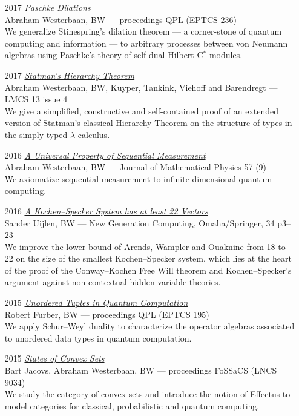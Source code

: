 \documentclass{article}
\newcommand\partitle[1]{\vskip20pt\par\noindent{\textsf{\textbf{#1}}}}
\begin{document}
\partitle{Selected publications}
\begin{itemize}
    \item[2017] \emph{\href{http://eptcs.web.cse.unsw.edu.au/paper.cgi?QPL2016.15}{Paschke Dilations}}\\
    {\footnotesize Abraham Westerbaan, BW --- proceedings QPL (EPTCS 236)}\\
    We generalize Stinespring's dilation theorem --- a corner-stone
        of quantum computing and information --- to arbitrary processes
        between von Neumann algebras using Paschke's theory of
        self-dual Hilbert C$^*$-modules.
    \item[2017] \emph{\href{https://lmcs.episciences.org/4089}{Statman's Hierarchy Theorem}}\\
    {\footnotesize Abraham Westerbaan, BW,  Kuyper, Tankink, Viehoff and Barendregt --- LMCS 13 issue 4}\\
    We give a simplified, constructive and self-contained proof
        of an extended version of Statman's classical Hierarchy Theorem
        on the structure of types in the simply typed $\lambda$-calculus.
    \item[2016] \emph{\href{http://scitation.aip.org/content/aip/journal/jmp/57/9/10.1063/1.4961526}{A Universal Property of Sequential Measurement}}\\
    {\footnotesize Abraham Westerbaan, BW ---
    Journal of Mathematical Physics 57 (9)}\\
    We axiomatize sequential measurement to infinite dimensional quantum
    computing.
\item[2016] \emph{\href{https://link.springer.com/article/10.1007/s00354-016-0202-5}{A Kochen--Specker System has at least 22 Vectors}}\\
    {\footnotesize Sander Uijlen, BW ---  New Generation Computing, Omaha/Springer, 34 p3--23}\\
    We improve the lower bound of Arends, Wampler and Ouaknine from 18 to 22
    on the size of the smallest Kochen--Specker system, which lies
    at the heart of the proof of the Conway--Kochen Free Will
    theorem and Kochen--Specker's argument against non-contextual
    hidden variable theories.
\item[2015] \emph{\href{http://eptcs.web.cse.unsw.edu.au/paper.cgi?QPL2015.15}{Unordered Tuples in Quantum Computation}}\\
    {\footnotesize Robert Furber, BW --- proceedings QPL (EPTCS 195)}\\
        We apply Schur--Weyl duality to characterize the operator algebras
        associated to unordered data types in quantum computation.
    \item[2015] \emph{\href{https://link.springer.com/chapter/10.1007/978-3-662-46678-0_6}{States of Convex Sets}}\\
    {\footnotesize Bart Jacovs, Abraham Westerbaan, BW ---
        proceedings FoSSaCS (LNCS 9034)}\\
    We study the category of convex sets and introduce the notion of Effectus
        to model categories for classical, probabilistic and
        quantum computing.
\end{itemize}
\end{document}
